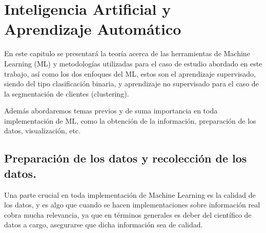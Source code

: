 

\chapter{Inteligencia Artificial y Aprendizaje Automático}

En este capitulo se presentará la teoría acerca de las herramientas de Machine Learning (ML) y metodologías utilizadas para el caso de estudio abordado en este trabajo, así como los dos enfoques del ML, estos son el aprendizaje supervisado, siendo del tipo clasificación binaria, y aprendizaje no supervisado para el caso de la segmentación de clientes (clustering). 

Además abordaremos temas previos y de suma importancia en toda implementación de ML, como la obtención de la información, preparación de los datos, visualización, etc.




\section{Preparación de los datos y recolección de los datos.}

Una parte crucial en toda implementación de Machine Learning es la calidad de los datos, y es algo que cuando se hacen implementaciones sobre información real cobra mucha relevancia, ya que en términos generales es deber del científico de datos a cargo, asegurarse que dicha información sea de calidad.

